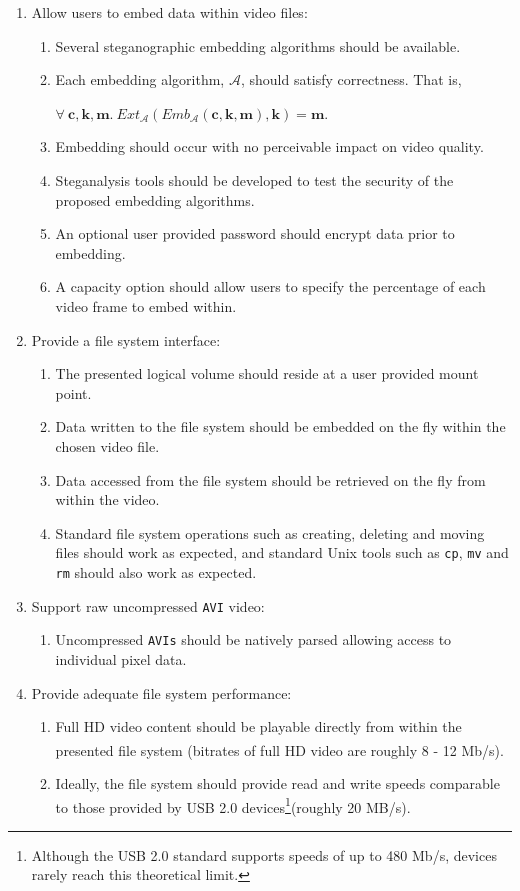 \documentclass[paper=a4, fontsize=11pt,twoside]{scrartcl}
\numberwithin{table}{section}
\numberwithin{figure}{section}
\numberwithin{algorithm}{section}
\begin{document}
\begin{enumerate}
\item Allow users to embed data within video files:
	\begin{enumerate}
		\item Several steganographic embedding algorithms should be available.
		\item Each embedding algorithm, $\mathcal{A}$, should satisfy correctness. That is,
		\begin{center}
			$\forall ~\textbf{c}, \textbf{k}, \textbf{m}. ~Ext_{\mathcal{A}}(Emb_{\mathcal{A}}(\textbf{c}, \textbf{k}, \textbf{m}), \textbf{k}) = \textbf{m}$.
		\end{center}
		\item Embedding should occur with no perceivable impact on video quality.
		\item Steganalysis tools should be developed to test the security of the proposed embedding algorithms.
		\item An optional user provided password should encrypt data prior to embedding.
		\item A capacity option should allow users to specify the percentage of each video frame to embed within.
	\end{enumerate}
\item Provide a file system interface:
	\begin{enumerate}
		\item The presented logical volume should reside at a user provided mount point.		
		\item Data written to the file system should be embedded on the fly within the chosen video file.
		\item Data accessed from the file system should be retrieved on the fly from within the video.
		\item Standard file system operations such as creating, deleting and moving files should work as expected, and standard Unix tools such as \texttt{cp}, \texttt{mv} and \texttt{rm} should also work as expected.
	\end{enumerate}	
\item Support raw uncompressed \texttt{AVI} video:
	\begin{enumerate}
		\item Uncompressed \texttt{AVIs} should be natively parsed allowing access to individual pixel data.
	\end{enumerate}	
\item Provide adequate file system performance:
	\begin{enumerate}
		\item Full HD video content should be playable directly from within the presented file system (bitrates of full HD video are roughly 8 - 12 Mb/s\textsuperscript{\cite{bitrate}}).
		\item Ideally, the file system should provide read and write speeds comparable to those provided by USB 2.0 devices\footnote{Although the USB 2.0 standard supports speeds of up to 480 Mb/s, devices rarely reach this theoretical limit.}(roughly 20 MB/s\textsuperscript{\cite{usb2}}).
	\end{enumerate}		
\end{enumerate}
\end{document}
